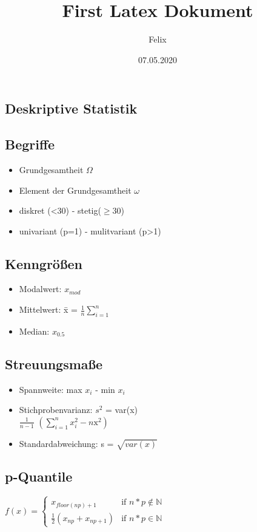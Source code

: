 \documentclass[10pt,landscape,a4paper]{article}
\title{First Latex Dokument}
\author {Felix}
\date{07.05.2020}
\begin{document}
\begin{multicols}{3}
\section{Deskriptive Statistik}
\subsection{Begriffe}
\begin{itemize}
	\setlength\itemsep{-0.5em}
	\item Grundgesamtheit $\Omega$ 
	\item Element der Grundgesamtheit $\omega$
	\item diskret (<30) - stetig($\geq$30)
	\item univariant (p=1) - mulitvariant (p>1)
\end{itemize}

\subsection{Kenngrößen}
\begin{itemize}
	\setlength\itemsep{-0.5em}
	\item Modalwert: $x_{mod}$
	\item Mittelwert: \={x} = $\tfrac{1}{n} \sum\limits_{i=1}^{n}$
	\item Median: $x_{0.5}$
\end{itemize}

\subsection{Streuungsmaße}
\begin{itemize}
	\setlength\itemsep{-0.5em}
	\item Spannweite: max $x_i$ - min $x_i$
	\item Stichprobenvarianz: $s^2$ = var(x)\\
		 $\tfrac{1}{n-1}$ $(\sum\limits_{i=1}^{n}x_i^2 - n{\text{\={x}}}^2)$
	\item Standardabweichung: s = $\sqrt{var(x)}$
\end{itemize}

\subsection{p-Quantile}
$
    f(x) =
    \begin{cases}
        x_{floor(np)+1} & \text{if $n * p \not\in \mathbb{N}$}\\
        \frac{1}{2}(x_{np} + x_{np+1}) & \text{if $n * p \in \mathbb{N}$}
    \end{cases}
$


\end{multicols}
\end{document}
